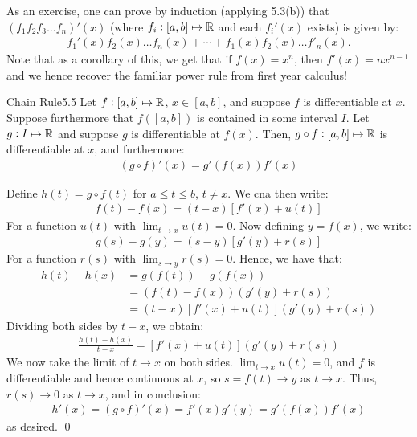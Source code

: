 \newpage 
\noindent As an exercise, one can prove by induction (applying 5.3(b)) that $(f_1f_2f_3\ldots f_n)'(x)$ (where $f_i: [a, b] \mapsto \mathbb{R}$ and each $f_i'(x)$ exists) is given by:
\begin{align*}
    f_1'(x)f_2(x)\ldots f_n(x) + \cdots + f_1(x)f_2(x)\ldots f'_n(x).
\end{align*}
Note that as a corollary of this, we get that if $f(x) = x^n$, then $f'(x) = nx^{n-1}$ and we hence recover the familiar power rule from first year calculus!

\setcounter{rudin}{4}
\begin{theorem}{Chain Rule}{5.5}
    Let $f: [a, b] \mapsto \mathbb{R}$, $x \in [a, b]$, and suppose $f$ is differentiable at $x$. Suppose furthermore that $f([a, b])$ is contained in some interval $I$. Let $g: I \mapsto \mathbb{R}$ and suppose $g$ is differentiable at $f(x)$. Then, $g \circ f: [a, b] \mapsto \mathbb{R}$ is differentiable at $x$, and furthermore:
    \begin{align*}
        (g \circ f)'(x) = g'(f(x))f'(x)
    \end{align*}
\end{theorem}
\begin{nproof}
    Define $h(t) = g \circ f(t)$ for $a \leq t \leq b$, $t \neq x$. We cna then write:
    \begin{align*}
        f(t) - f(x) = (t-x)\left[f'(x) + u(t)\right]
    \end{align*}
    For a function $u(t)$ with $\lim_{t \rightarrow x} u(t) = 0$. Now defining $y = f(x)$, we write:
    \begin{align*}
        g(s) - g(y) = (s-y)\left[g'(y) + r(s)\right]
    \end{align*}
    For a function $r(s)$ with $\lim_{s \rightarrow y}r(s) = 0$. Hence, we have that:
    \begin{align*}
        h(t) - h(x) &= g(f(t)) - g(f(x))
        \\ &= \left(f(t) - f(x)\right)\left(g'(y) + r(s)\right)
        \\ &= (t- x)\left[f'(x) + u(t)\right]\left(g'(y) + r(s)\right)
    \end{align*}
    Dividing both sides by $t - x$, we obtain:
    \begin{align*}
        \frac{h(t) - h(x)}{t - x} = \left[f'(x) + u(t)\right]\left(g'(y) + r(s)\right)
    \end{align*}
    We now take the limit of $t \rightarrow x$ on both sides. $\lim_{t \rightarrow x} u(t) = 0$, and $f$ is differentiable and hence continuous at $x$, so $s = f(t) \rightarrow y$ as $t \rightarrow x$. Thus, $r(s) \rightarrow 0$ as $t \rightarrow x$, and in conclusion:
    \begin{align*}
        h'(x) = (g \circ f)'(x) =  f'(x)g'(y) = g'(f(x))f'(x)
    \end{align*}
    as desired. \qed
\end{nproof}


